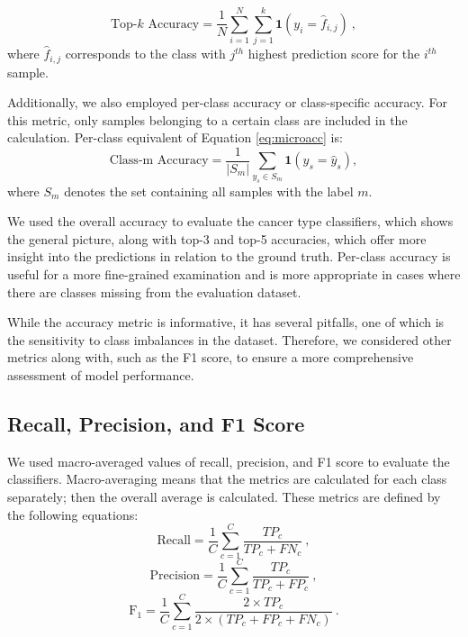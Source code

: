 \documentclass{l4proj}
\begin{document}
\begin{equation}
    \text{Top-$k$ Accuracy} = \frac{1}{N} \sum_{i=1}^{N} \sum_{j=1}^k \boldsymbol{1}(y_i = \hat{f}_{i,j})\ ,
\end{equation}
where $\hat{f}_{i,j}$ corresponds to the class with $j^{th}$ highest prediction score for the $i^{th}$ sample.

Additionally, we also employed per-class accuracy or class-specific accuracy. For this metric, only samples belonging to a certain class are included in the calculation. Per-class equivalent of Equation \ref{eq:microacc} is:
\begin{equation} \label{eq:macroacc}
    \text{Class-m Accuracy} = \frac{1}{|S_m|} \sum_{y_s \in S_m}\boldsymbol{1}(y_s = \hat{y}_s),
\end{equation}
where $S_m$ denotes the set containing all samples with the label $m$.

We used the overall accuracy to evaluate the cancer type classifiers, which shows the general picture, along with top-3 and top-5 accuracies, which offer more insight into the predictions in relation to the ground truth. Per-class accuracy is useful for a more fine-grained examination and is more appropriate in cases where there are classes missing from the evaluation dataset.

While the accuracy metric is informative, it has several pitfalls, one of which is the sensitivity to class imbalances in the dataset. Therefore, we considered other metrics along with, such as the F1 score, to ensure a more comprehensive assessment of model performance.

\subsection{Recall, Precision, and F1 Score} \label{sec:F1-score}
We used macro-averaged values of recall, precision, and F1 score to evaluate the classifiers. Macro-averaging means that the metrics are calculated for each class separately; then the overall average is calculated. These metrics are defined by the following equations:
\begin{equation}
    \text{Recall} = \frac{1}{C}\sum_{c=1}^{C}\frac{TP_c}{TP_c + FN_c}\ ,
\end{equation}
\begin{equation}
    \text{Precision} = \frac{1}{C}\sum_{c=1}^{C}\frac{TP_c}{TP_c+FP_c}\ ,
\end{equation}
\begin{equation}\label{eq:f1}
    \text{F}_1 = \frac{1}{C}\sum_{c=1}^{C}\frac{2 \times TP_c}{2 \times (TP_c + FP_c + FN_c)}\ .
\end{equation}
\end{document}
